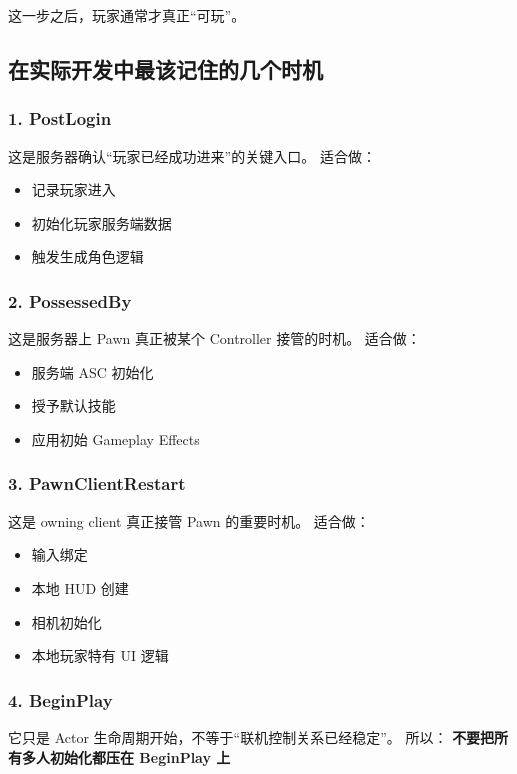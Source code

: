 这一步之后，玩家通常才真正“可玩”。




\subsection{在实际开发中最该记住的几个时机}
\subsubsection{1. PostLogin} 这是服务器确认“玩家已经成功进来”的关键入口。
适合做：
\begin{itemize} \item 记录玩家进入 \item 初始化玩家服务端数据 \item 触发生成角色逻辑 \end{itemize}

\subsubsection{2. PossessedBy} 这是服务器上 Pawn 真正被某个 Controller 接管的时机。
适合做：
\begin{itemize} \item 服务端 ASC 初始化 \item 授予默认技能 \item 应用初始 Gameplay Effects \end{itemize}

\subsubsection{3. PawnClientRestart} 这是 owning client 真正接管 Pawn 的重要时机。
适合做：
\begin{itemize} \item 输入绑定 \item 本地 HUD 创建 \item 相机初始化 \item 本地玩家特有 UI 逻辑 \end{itemize}

\subsubsection{4. BeginPlay} 它只是 Actor 生命周期开始，不等于“联机控制关系已经稳定”。
所以： \textbf{不要把所有多人初始化都压在 BeginPlay 上}

